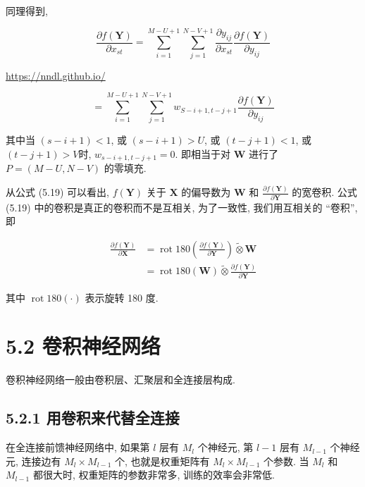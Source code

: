 \documentclass[10pt]{article}
\begin{document}
同理得到,


\begin{equation*}
\frac{\partial f(\boldsymbol{Y})}{\partial x_{s t}}=\sum_{i=1}^{M-U+1} \sum_{j=1}^{N-V+1} \frac{\partial y_{i j}}{\partial x_{s t}} \frac{\partial f(\boldsymbol{Y})}{\partial y_{i j}} \tag{5.18}
\end{equation*}


\href{https://nndl.github.io/}{https://nndl.github.io/}


\begin{equation*}
=\sum_{i=1}^{M-U+1} \sum_{j=1}^{N-V+1} w_{S-i+1, t-j+1} \frac{\partial f(\boldsymbol{Y})}{\partial y_{i j}} \tag{5.19}
\end{equation*}


其中当 $(s-i+1)<1$, 或 $(s-i+1)>U$, 或 $(t-j+1)<1$, 或 $(t-j+1)>V$时, $w_{s-i+1, t-j+1}=0$. 即相当于对 $\boldsymbol{W}$ 进行了 $P=(M-U, N-V)$ 的零填充.

从公式 (5.19) 可以看出, $f(\boldsymbol{Y})$ 关于 $\boldsymbol{X}$ 的偏导数为 $\boldsymbol{W}$ 和 $\frac{\partial f(\boldsymbol{Y})}{\partial \boldsymbol{Y}}$ 的宽卷积. 公式 (5.19) 中的卷积是真正的卷积而不是互相关, 为了一致性, 我们用互相关的 “卷积”, 即


\begin{align*}
\frac{\partial f(\boldsymbol{Y})}{\partial \boldsymbol{X}} & =\operatorname{rot} 180\left(\frac{\partial f(\boldsymbol{Y})}{\partial \boldsymbol{Y}}\right) \tilde{\otimes} \boldsymbol{W}  \tag{5.20}\\
& =\operatorname{rot} 180(\boldsymbol{W}) \tilde{\otimes} \frac{\partial f(\boldsymbol{Y})}{\partial \boldsymbol{Y}} \tag{5.21}
\end{align*}


其中 $\operatorname{rot} 180(\cdot)$ 表示旋转 180 度.

\section*{5.2 卷积神经网络}
卷积神经网络一般由卷积层、汇聚层和全连接层构成.

\subsection*{5.2.1 用卷积来代替全连接}
在全连接前馈神经网络中, 如果第 $l$ 层有 $M_{l}$ 个神经元, 第 $l-1$ 层有 $M_{l-1}$ 个神经元, 连接边有 $M_{l} \times M_{l-1}$ 个, 也就是权重矩阵有 $M_{l} \times M_{l-1}$ 个参数. 当 $M_{l}$ 和 $M_{l-1}$ 都很大时, 权重矩阵的参数非常多, 训练的效率会非常低.
\end{document}
